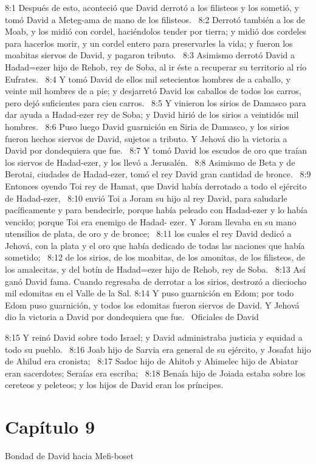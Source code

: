 8:1 Después de esto, aconteció que David derrotó a los filisteos y los sometió, y tomó David a Meteg-ama de mano de los filisteos.  
8:2 Derrotó también a los de Moab, y los midió con cordel, haciéndolos tender por tierra; y midió dos cordeles para hacerlos morir, y un cordel entero para preservarles la vida; y fueron los moabitas siervos de David, y pagaron tributo.  
8:3 Asimismo derrotó David a Hadad=ezer hijo de Rehob, rey de Soba, al ir éste a recuperar su territorio al río Eufrates.  
8:4 Y tomó David de ellos mil setecientos hombres de a caballo, y veinte mil hombres de a pie; y desjarretó David los caballos de todos los carros, pero dejó suficientes para cien carros.  
8:5 Y vinieron los sirios de Damasco para dar ayuda a Hadad-ezer rey de Soba; y David hirió de los sirios a veintidós mil hombres.  
8:6 Puso luego David guarnición en Siria de Damasco, y los sirios fueron hechos siervos de David, sujetos a tributo. Y Jehová dio la victoria a David por dondequiera que fue.  
8:7 Y tomó David los escudos de oro que traían los siervos de Hadad-ezer, y los llevó a Jerusalén.  
8:8 Asimismo de Beta y de Berotai, ciudades de Hadad-ezer, tomó el rey David gran cantidad de bronce.  
8:9 Entonces oyendo Toi rey de Hamat, que David había derrotado a todo el ejército de Hadad-ezer,  
8:10 envió Toi a Joram su hijo al rey David, para saludarle pacíficamente y para bendecirle, porque había peleado con Hadad-ezer y lo había vencido; porque Toi era enemigo de Hadad- ezer. Y Joram llevaba en su mano utensilios de plata, de oro y de bronce;  
8:11 los cuales el rey David dedicó a Jehová, con la plata y el oro que había dedicado de todas las naciones que había sometido;  
8:12 de los sirios, de los moabitas, de los amonitas, de los filisteos, de los amalecitas, y del botín de Hadad=ezer hijo de Rehob, rey de Soba.  
8:13 Así ganó David fama. Cuando regresaba de derrotar a los sirios, destrozó a dieciocho mil edomitas en el Valle de la Sal. 
8:14 Y puso guarnición en Edom; por todo Edom puso guarnición, y todos los edomitas fueron siervos de David. Y Jehová dio la victoria a David por dondequiera que fue.  
Oficiales de David  

8:15 Y reinó David sobre todo Israel; y David administraba justicia y equidad a todo su pueblo.  
8:16 Joab hijo de Sarvia era general de su ejército, y Josafat hijo de Ahilud era cronista;  
8:17 Sadoc hijo de Ahitob y Ahimelec hijo de Abiatar eran sacerdotes; Seraías era escriba;  
8:18 Benaía hijo de Joiada estaba sobre los cereteos y peleteos; y los hijos de David eran los príncipes.  
\section*{Capítulo 9 }
Bondad de David hacia Mefi-boset  


